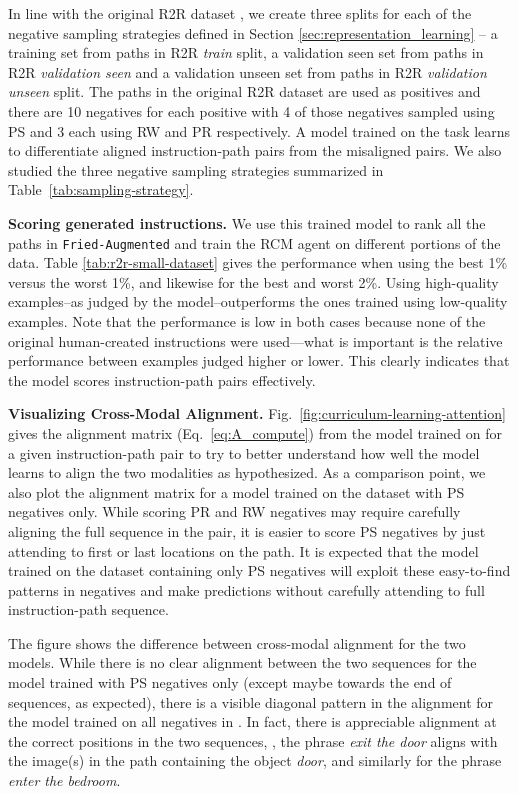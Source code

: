 \documentclass[10pt,twocolumn,letterpaper]{article}
\newcommand{\friedaug}{\texttt{Fried-Augmented}}
\begin{document}
In line with the original R2R dataset \cite{Anderson:2018:VLN}, we create three splits for each of the negative sampling strategies defined in Section \ref{sec:representation_learning} -- a training set from paths in R2R \textit{train} split, a validation seen set from paths in R2R \textit{validation seen} and a validation unseen set from paths in R2R \textit{validation unseen} split. The paths in the original R2R dataset are used as positives and there are 10 negatives for each positive with 4 of those negatives sampled using PS and 3 each using RW and PR respectively. A model trained on the task {\taskcma} learns to differentiate aligned instruction-path pairs from the misaligned pairs. We also studied the three negative sampling strategies summarized in Table~\ref{tab:sampling-strategy}.

\textbf{Scoring generated instructions.} We use this trained model to rank all the paths in {\friedaug} and train the RCM agent on different portions of the data. Table \ref{tab:r2r-small-dataset} gives the performance when using the best 1\% versus the worst 1\%, and likewise for the best and worst 2\%. Using high-quality examples--as judged by the model--outperforms the ones trained using low-quality examples. Note that the performance is low in both cases because none of the original human-created instructions were used---what is important is the relative performance between examples judged higher or lower. This clearly indicates that the model scores instruction-path pairs effectively.

\textbf{Visualizing Cross-Modal Alignment.} Fig.~\ref{fig:curriculum-learning-attention} gives the alignment matrix  (Eq.~\ref{eq:A_compute}) from the model trained on {\taskcma} for a given instruction-path pair to try to better understand how well the model learns to align the two modalities as hypothesized. As a comparison point, we also plot the alignment matrix for a model trained on the dataset with PS negatives only. While scoring PR and RW negatives may require carefully aligning the full sequence in the pair, it is easier to score PS negatives by just attending to first or last locations on the path. It is expected that the model trained on the dataset containing only PS negatives will exploit these easy-to-find patterns in negatives and make predictions without carefully attending to full instruction-path sequence.

The figure shows the difference between cross-modal alignment for the two models. While there is no clear alignment between the two sequences for the model trained with PS negatives only (except maybe towards the end of sequences, as expected), there is a visible diagonal pattern in the alignment for the model trained on all negatives in {\taskcma}. In fact, there is appreciable alignment at the correct positions in the two sequences, \eg, the phrase \textit{exit the door} aligns with the image(s) in the path containing the object \textit{door}, and similarly for the phrase \textit{enter the bedroom}.
\end{document}
